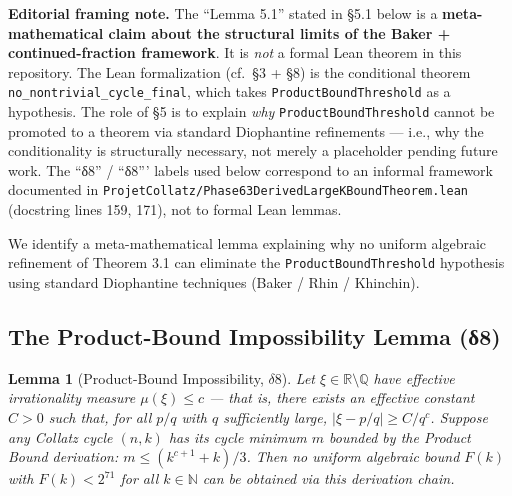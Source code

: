 \documentclass[
  11pt]{amsart}
\theoremstyle{plain}
\newtheorem{lemma}[theorem]{Lemma}
\theoremstyle{definition}
\theoremstyle{remark}
\begin{document}
\textbf{Editorial framing note.} The ``Lemma 5.1'' stated in §5.1 below
is a \textbf{meta-mathematical claim about the structural limits of the
Baker + continued-fraction framework}. It is \emph{not} a formal Lean
theorem in this repository. The Lean formalization (cf.~§3 + §8) is the
conditional theorem \texttt{no\_nontrivial\_cycle\_final}, which takes
\texttt{ProductBoundThreshold} as a hypothesis. The role of §5 is to
explain \emph{why} \texttt{ProductBoundThreshold} cannot be promoted to
a theorem via standard Diophantine refinements --- i.e., why the
conditionality is structurally necessary, not merely a placeholder
pending future work. The ``δ8'' / ``δ8''' labels used below correspond
to an informal framework documented in
\texttt{ProjetCollatz/Phase63DerivedLargeKBoundTheorem.lean} (docstring
lines 159, 171), not to formal Lean lemmas.

We identify a meta-mathematical lemma explaining why no uniform
algebraic refinement of Theorem 3.1 can eliminate the
\texttt{ProductBoundThreshold} hypothesis using standard Diophantine
techniques (Baker / Rhin / Khinchin).

\subsection{The Product-Bound Impossibility Lemma
(δ8)}\label{the-product-bound-impossibility-lemma-ux3b48}

\begin{lemma}[Product-Bound Impossibility, $\delta 8$]
\label{lem:productbound}
Let $\xi \in \mathbb{R} \setminus \mathbb{Q}$ have effective
irrationality measure $\mu(\xi) \leq c$ — that is, there exists an
effective constant $C > 0$ such that, for all $p/q$ with $q$
sufficiently large, $|\xi - p/q| \geq C / q^c$. Suppose any Collatz
cycle $(n, k)$ has its cycle minimum $m$ bounded by the Product
Bound derivation: $m \leq (k^{c+1} + k)/3$. Then no uniform
algebraic bound $F(k)$ with $F(k) < 2^{71}$ for all $k \in
\mathbb{N}$ can be obtained via this derivation chain.
\end{lemma}
\end{document}
